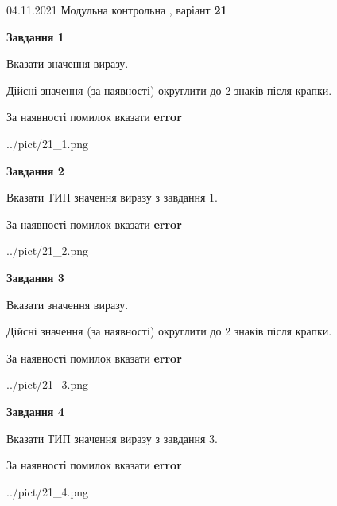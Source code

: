 \documentclass[11pt, ukrainian]{article}
\begin{document}
{04.11.2021 Модульна контрольна , варіант  \No \textbf { 21 }\par}
{
\begin {large}
{\begin {center}\textbf{Завдання 1}\end {center}}\par
Вказати значення виразу. \par
Дійсні значення (за наявності) округлити до 2 знаків після крапки. \par
За наявності помилок вказати \textbf{error}

\begin{center}
	{../pict/21_1.png}
\end{center}
\newpage

{\begin {center}\textbf{Завдання 2}\end {center}}\par
Вказати ТИП значення виразу з завдання 1. \par
За наявності помилок вказати \textbf{error}

\begin{center}
	{../pict/21_2.png}
\end{center}
\newpage

{\begin {center}\textbf{Завдання 3}\end {center}}\par
Вказати значення виразу. \par
Дійсні значення (за наявності) округлити до 2 знаків після крапки. \par
За наявності помилок вказати \textbf{error}

\begin{center}
	{../pict/21_3.png}
\end{center}
\newpage

{\begin {center}\textbf{Завдання 4}\end {center}}\par
Вказати ТИП значення виразу з завдання 3. \par
За наявності помилок вказати \textbf{error}

\begin{center}
	{../pict/21_4.png}
\end{center}
\newpage


\end{large}}
\end{document}
